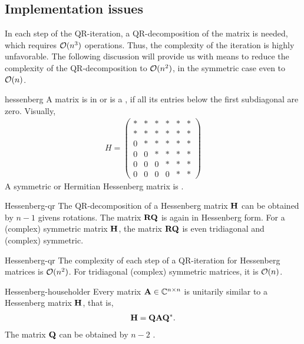 \subsection{Implementation issues}
\begin{intro}
  In each step of the QR-iteration, a QR-decomposition of the matrix
  is needed, which requires $\mathcal O(n^3)$ operations. Thus, the
  complexity of the iteration is highly unfavorable. The following
  discussion will provide us with means to reduce the complexity of
  the QR-decomposition to $\mathcal O(n^2)$, in the symmetric case even to
  $\mathcal O(n)$.
\end{intro}

\begin{Definition}{hessenberg}
  A matrix is in  or is a , if all its entries below the first subdiagonal are zero. Visually,
  \begin{gather}
    H = 
    \begin{pmatrix}
      *&*&*&*&*&*\\
      *&*&*&*&*&*\\
      0&*&*&*&*&*\\
      0&0&*&*&*&*\\
      0&0&0&*&*&*\\
      0&0&0&0&*&*
    \end{pmatrix}
  \end{gather}
  A symmetric or Hermitian Hessenberg matrix is .
\end{Definition}

\begin{Theorem}{Hessenberg-qr}
  The QR-decomposition of a Hessenberg matrix $\mathbf H$ can be obtained
  by $n-1$ givens rotations. The matrix $\mathbf R\mathbf Q$ is again in
  Hessenberg form. For a (complex) symmetric matrix $\mathbf H$, the
  matrix $\mathbf R\mathbf Q$ is even tridiagonal and (complex) symmetric.
\end{Theorem}

\begin{Corollary}{Hessenberg-qr}
  The complexity of each step of a QR-iteration for Hessenberg matrices is $\mathcal O(n^2)$. For tridiagonal (complex) symmetric matrices, it is $\mathcal O(n)$.
\end{Corollary}

\begin{Theorem}{Hessenberg-householder}
  Every matrix $\mathbf A\in\mathbb C^{n\times n}$ is unitarily similar to a Hessenberg matrix $\mathbf H$, that is,
  \begin{gather}
    \mathbf H = \mathbf Q \mathbf A \mathbf Q^*.
  \end{gather}
  The matrix $\mathbf Q$ can be obtained by $n-2$ .
\end{Theorem}

